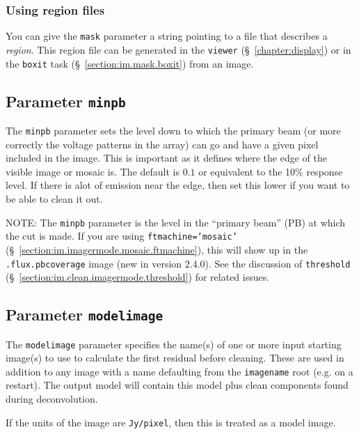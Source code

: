 \subsubsection{Using region files}
\label{section:im.clean.mask.regions}

You can give the {\tt mask} parameter a string pointing to a file
that describes a {\it region}.  This region file can be generated
in the {\tt viewer} (\S~\ref{chapter:display}) or in the {\tt boxit}
task (\S~\ref{section:im.mask.boxit}) from an image.

\subsection{Parameter {\tt minpb} }
\label{section:im.clean.minpb}

The {\tt minpb} parameter sets the level down to which the primary
beam (or more correctly the voltage patterns in the array) can go and
have a given pixel included in the image.  This is important as it
defines where the edge of the visible image or mosaic is. 
The default is $0.1$ or
equivalent to the 10\% response level.  If there is alot of emission
near the edge, then set this lower if you want to be
able to clean it out.

NOTE: The {\tt minpb} parameter is the level in the ``primary beam''
(PB) at which the cut is made.  If you are using {\tt ftmachine='mosaic'}
(\S~\ref{section:im.imagermode.mosaic.ftmachine}), this will show
up in the {\tt .flux.pbcoverage} image (new in version 2.4.0).
See the discussion of {\tt threshold} 
(\S~\ref{section:im.clean.imagermode.threshold}) for related issues.

\subsection{Parameter {\tt modelimage} }
\label{section:im.clean.modelimage}

The {\tt modelimage} parameter specifies the name(s) of one or more
input starting image(s) to use to calculate the first residual before
cleaning.  These are used in addition to any image with a name
defaulting from the {\tt imagename} root (e.g. on a restart).
The output model will contain this model plus
clean components found during deconvolution.  

If the units of the image are {\tt Jy/pixel}, then this is treated
as a model image.

